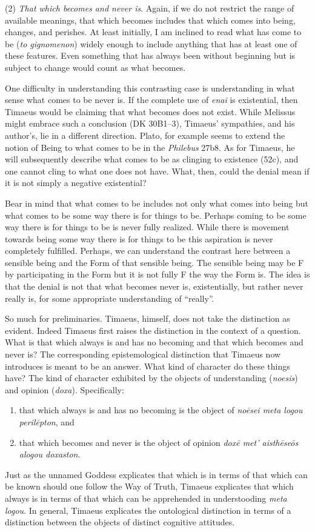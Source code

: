 (2) \emph{That which becomes and never is}. Again, if we do not restrict the range of available meanings, that which becomes includes that which comes into being, changes, and perishes. At least initially, I am inclined to read what has come to be (\emph{to gignomenon}) widely enough to include anything that has at least one of these features. Even something that has always been without beginning but is subject to change would count as what becomes.

One difficulty in understanding this contrasting case is understanding in what sense what comes to be never is. If the complete use of \emph{enai} is existential, then Timaeus would be claiming that what becomes does not exist. While Melissus might embrace such a conclusion (DK 30B1--3), Timaeus' sympathies, and his author's, lie in a different direction. Plato, for example seems to extend the notion of Being to what comes to be in the \emph{Philebus} 27b8. As for Timaeus, he will subsequently describe what comes to be as clinging to existence (52c), and one cannot cling to what one does not have. What, then, could the denial mean if it is not simply a negative existential?

Bear in mind that what comes to be includes not only what comes into being but what comes to be some way there is for things to be. Perhaps coming to be some way there is for things to be is never fully realized. While there is movement towards being some way there is for things to be this aspiration is never completely fulfilled. Perhaps, we can understand the contrast here between a sensible being and the Form of that sensible being. The sensible being may be F by participating in the Form but it is not fully F the way the Form is. The idea is that the denial is not that what becomes never is, existentially, but rather never really is, for some appropriate understanding of ``really''.

So much for preliminaries. Timaeus, himself, does not take the distinction as evident. Indeed Timaeus first raises the distinction in the context of a question. What is that which always is and has no becoming and that which becomes and never is? The corresponding epistemological distinction that Timaeus now introduces is meant to be an answer.  What kind of character do these things have? The kind of character exhibited by the objects of understanding (\emph{noesis}) and opinion (\emph{doxa}). Specifically: 
\begin{enumerate}[(1)]
	\item that which always is and has no becoming is the object of \emph{noēsei meta logou perilēpton}, and
	\item that which becomes and never is the object of opinion \emph{doxē met' aisthēseōs alogou doxaston}.
\end{enumerate}
Just as the unnamed Goddess explicates that which is in terms of that which can be known should one follow the Way of Truth, Timaeus explicates that which always is in terms of that which can be apprehended in understooding \emph{meta logou}. In general, Timaeus explicates the ontological distinction in terms of a distinction between the objects of distinct cognitive attitudes.

